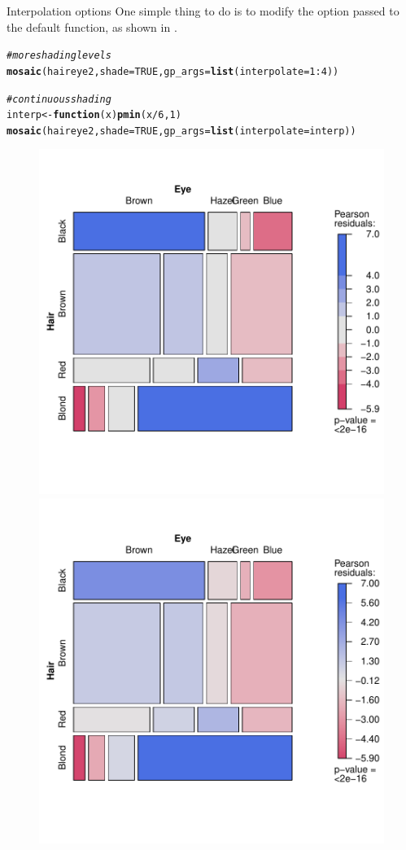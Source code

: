 \documentclass[11pt]{book}\usepackage[]{graphicx}\usepackage[]{color}
\makeatletter
\newcommand{\hlnum}[1]{\textcolor[rgb]{0.686,0.059,0.569}{#1}}%
\newcommand{\hlcom}[1]{\textcolor[rgb]{0.678,0.584,0.686}{\textit{#1}}}%
\newcommand{\hlopt}[1]{\textcolor[rgb]{0,0,0}{#1}}%
\newcommand{\hlstd}[1]{\textcolor[rgb]{0.345,0.345,0.345}{#1}}%
\newcommand{\hlkwa}[1]{\textcolor[rgb]{0.161,0.373,0.58}{\textbf{#1}}}%
\newcommand{\hlkwb}[1]{\textcolor[rgb]{0.69,0.353,0.396}{#1}}%
\newcommand{\hlkwc}[1]{\textcolor[rgb]{0.333,0.667,0.333}{#1}}%
\newcommand{\hlkwd}[1]{\textcolor[rgb]{0.737,0.353,0.396}{\textbf{#1}}}%
\newenvironment{kframe}{%
 \def\at@end@of@kframe{}%
 \ifinner\ifhmode%
  \def\at@end@of@kframe{\end{minipage}}%
  \begin{minipage}{\columnwidth}%
 \fi\fi%
 \def\FrameCommand##1{\hskip\@totalleftmargin \hskip-\fboxsep
 \colorbox{shadecolor}{##1}\hskip-\fboxsep
     \hskip-\linewidth \hskip-\@totalleftmargin \hskip\columnwidth}%
 \MakeFramed {\advance\hsize-\width
   \@totalleftmargin\z@ \linewidth\hsize
   \@setminipage}}%
 {\par\unskip\endMakeFramed%
 \at@end@of@kframe}
\newenvironment{knitrout}{}{} %
\renewenvironment{knitrout}{\small\renewcommand{\baselinestretch}{.85}}{} %
\makeatother
\begin{document}
\begin{Example}[interp]{Interpolation options}
One simple thing to do is to modify the  option passed to the
default  function, as shown in .
\begin{knitrout}
\color{fgcolor}\begin{kframe}
\begin{alltt}
\hlcom{# more shading levels}
\hlkwd{mosaic}\hlstd{(haireye2,} \hlkwc{shade}\hlstd{=}\hlnum{TRUE}\hlstd{,} \hlkwc{gp_args}\hlstd{=}\hlkwd{list}\hlstd{(}\hlkwc{interpolate}\hlstd{=}\hlnum{1}\hlopt{:}\hlnum{4}\hlstd{))}

\hlcom{# continuous shading}
\hlstd{interp} \hlkwb{<-} \hlkwa{function}\hlstd{(}\hlkwc{x}\hlstd{)} \hlkwd{pmin}\hlstd{(x}\hlopt{/}\hlnum{6}\hlstd{,} \hlnum{1}\hlstd{)}
\hlkwd{mosaic}\hlstd{(haireye2,} \hlkwc{shade}\hlstd{=}\hlnum{TRUE}\hlstd{,} \hlkwc{gp_args}\hlstd{=}\hlkwd{list}\hlstd{(}\hlkwc{interpolate}\hlstd{=interp))}
\end{alltt}
\end{kframe}\begin{figure}[htbp]


\centerline{\includegraphics[width=.49\textwidth]{ch05/fig/HE-interp1} 
\includegraphics[width=.49\textwidth]{ch05/fig/HE-interp2} }


\end{figure}
\end{knitrout}
\end{Example}
\end{document}
